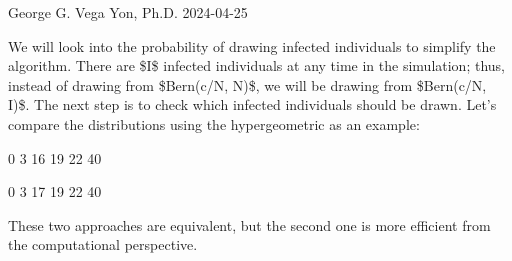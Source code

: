 George G. Vega Yon, Ph.\+D. 2024-\/04-\/25

We will look into the probability of drawing infected individuals to simplify the algorithm. There are \$I\$ infected individuals at any time in the simulation; thus, instead of drawing from \$\+Bern(c/N, N)\$, we will be drawing from \$\+Bern(c/N, I)\$. The next step is to check which infected individuals should be drawn. Let’s compare the distributions using the hypergeometric as an example\+:


\begin{DoxyCode}{0}
\DoxyCodeLine{}
\DoxyCodeLine{}
\DoxyCodeLine{}
\DoxyCodeLine{}

\end{DoxyCode}





\begin{DoxyCode}{0}
\DoxyCodeLine{}

\end{DoxyCode}
 \begin{DoxyVerb}  0%
   3   16   19   22   40 
\end{DoxyVerb}
 
\begin{DoxyCode}{0}

\end{DoxyCode}
 \begin{DoxyVerb}  0%
   3   17   19   22   40 
\end{DoxyVerb}
 These two approaches are equivalent, but the second one is more efficient from the computational perspective. 